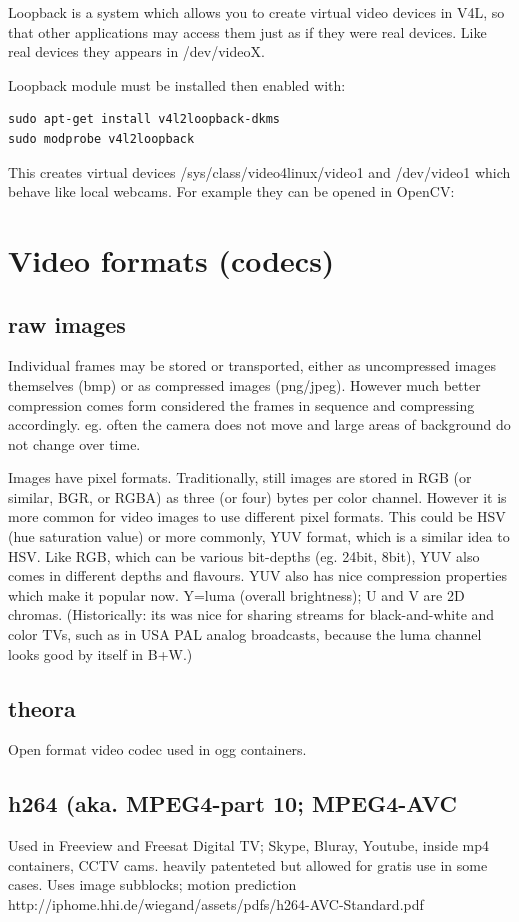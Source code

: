 \documentclass[oneside,english]{scrbook}
\begin{document}
Loopback is a system which allows you to create virtual video devices
in V4L, so that other applications may access them just as if they
were real devices. Like real devices they appears in /dev/videoX.

Loopback module must be installed then enabled with:

\begin{lstlisting}
sudo apt-get install v4l2loopback-dkms 
sudo modprobe v4l2loopback
\end{lstlisting}
This creates virtual devices /sys/class/video4linux/video1 and /dev/video1 which behave like local webcams. For example they can be opened in OpenCV:


\chapter{Video formats (codecs)}

\section{raw images}
Individual frames may be stored or transported, either as uncompressed images themselves (bmp) or as compressed images (png/jpeg). However much better compression comes form considered the frames in sequence and compressing accordingly. eg. often the camera does not move and large areas of background do not change over time.

Images have pixel formats. Traditionally, still images are stored in RGB (or similar, BGR, or RGBA) as three (or four) bytes per color channel.  However it is more common for video images to use different pixel formats.  This could be HSV (hue saturation value) or more commonly, YUV format, which is a similar idea to HSV.  Like RGB, which can be various bit-depths (eg. 24bit, 8bit), YUV also comes in different depths and flavours. YUV also has nice compression properties which make it popular now.  Y=luma (overall brightness); U and V are 2D chromas. (Historically: its was nice for sharing streams for black-and-white and color TVs, such as in USA PAL analog broadcasts, because the luma channel looks good by itself in B+W.)

\section{theora}
Open format video codec used in ogg containers.

\section{h264 (aka. MPEG4-part 10; MPEG4-AVC}
Used in Freeview and Freesat Digital TV; Skype, Bluray, Youtube, inside mp4 containers, CCTV cams.
heavily patenteted but allowed for gratis use in some cases.
Uses image subblocks;  motion prediction
http://iphome.hhi.de/wiegand/assets/pdfs/h264-AVC-Standard.pdf
\end{document}
